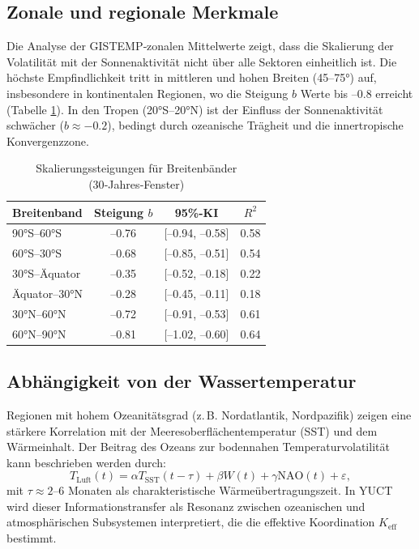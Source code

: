 \documentclass[12pt,a4paper]{article}
\newcommand{\Keff}{K_{\mathrm{eff}}}
\begin{document}
	\subsection{Zonale und regionale Merkmale}
	
	Die Analyse der GISTEMP‑zonalen Mittelwerte zeigt, dass die Skalierung der Volatilität mit der Sonnenaktivität nicht über alle Sektoren einheitlich ist. Die höchste Empfindlichkeit tritt in mittleren und hohen Breiten (45–75°) auf, insbesondere in kontinentalen Regionen, wo die Steigung \(b\) Werte bis –0.8 erreicht (Tabelle \ref{tab:zonal}). In den Tropen (20°S–20°N) ist der Einfluss der Sonnenaktivität schwächer (\(b \approx -0.2\)), bedingt durch ozeanische Trägheit und die innertropische Konvergenzzone.
	
	\begin{table}[htbp]
		\centering
		\caption{Skalierungssteigungen für Breitenbänder (30‑Jahres‑Fenster)}
		\label{tab:zonal}
		\begin{tabular}{@{}lccc@{}}
			\toprule
			Breitenband & Steigung \(b\) & 95\%-KI & \(R^2\) \\
			\midrule
			90°S–60°S & –0.76 & [–0.94, –0.58] & 0.58 \\
			60°S–30°S & –0.68 & [–0.85, –0.51] & 0.54 \\
			30°S–Äquator & –0.35 & [–0.52, –0.18] & 0.22 \\
			Äquator–30°N & –0.28 & [–0.45, –0.11] & 0.18 \\
			30°N–60°N & –0.72 & [–0.91, –0.53] & 0.61 \\
			60°N–90°N & –0.81 & [–1.02, –0.60] & 0.64 \\
			\bottomrule
		\end{tabular}
	\end{table}
	
	\subsection{Abhängigkeit von der Wassertemperatur}
	
	Regionen mit hohem Ozeanitätsgrad (z. B. Nordatlantik, Nordpazifik) zeigen eine stärkere Korrelation mit der Meeresoberflächentemperatur (SST) und dem Wärmeinhalt. Der Beitrag des Ozeans zur bodennahen Temperaturvolatilität kann beschrieben werden durch:
	\[
	T_{\text{Luft}}(t) = \alpha T_{\text{SST}}(t-\tau) + \beta W(t) + \gamma \text{NAO}(t) + \varepsilon,
	\]
	mit \(\tau \approx 2\)–6 Monaten als charakteristische Wärmeübertragungszeit. In YUCT wird dieser Informationstransfer als Resonanz zwischen ozeanischen und atmosphärischen Subsystemen interpretiert, die die effektive Koordination \(\Keff\) bestimmt.
	
\end{document}
